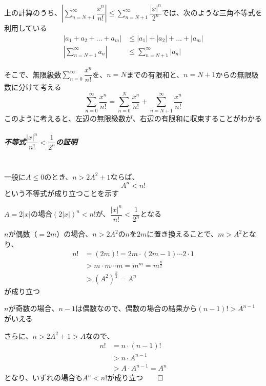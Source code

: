 \documentclass[../book_jiriki_calc]{subfiles}
\begin{document}
上の計算のうち、$\displaystyle\left| \sum_{n=N+1}^{\infty} \dfrac{x^n}{n!} \right| \leq \sum_{n=N+1}^{\infty} \dfrac{\left| x \right|^n}{2^n}$では、次のような三角不等式を利用している
\begin{align}
  \left| a_1 + a_2 + \dots + a_m \right|   & \leq |a_1| + |a_2| + \dots + |a_m| \\
  \left| \sum_{n=N+1}^{\infty} a_n \right| & \leq \sum_{n=N+1}^{\infty} |a_n|
\end{align}

\br

そこで、無限級数$\displaystyle\sum_{n=0}^{\infty} \dfrac{x^n}{n!}$を、$n=N$までの有限和と、$n=N+1$からの無限級数に分けて考える
\begin{equation}
  \sum_{n=0}^{\infty} \dfrac{x^n}{n!} = \sum_{n=0}^{N} \dfrac{x^n}{n!} + \sum_{n=N+1}^{\infty} \dfrac{x^n}{n!}
\end{equation}
このように考えると、左辺の無限級数が、右辺の有限和に収束することがわかる

\br

\subparagraph{不等式$\dfrac{\left|x\right|^n}{n!} < \dfrac{1}{2^n}$の証明}\quad\\

一般に$A \leq 0$のとき、$n > 2A^2 + 1$ならば、
\begin{equation}
  A^n < n!
\end{equation}
という不等式が成り立つことを示す

\br

$A=2|x|$の場合$\left( 2|x| \right)^n < n!$が、$\dfrac{\left|x\right|^n}{n!} < \dfrac{1}{2^n}$となる

\br

$n$が偶数（$=2m$）の場合、$n > 2A^2$の$n$を$2m$に置き換えることで、$m > A^2$となり、
\begin{align}
  n! & = (2m)! = 2m \cdot (2m-1) \cdots 2 \cdot 1   \\
     & > m \cdot m \cdots m = m^m = m^{\frac{n}{2}} \\
     & > \left( A^2 \right)^{\frac{n}{2}} = A^n
\end{align}
が成り立つ

\br

$n$が奇数の場合、$n-1$は偶数なので、偶数の場合の結果から$(n-1)! > A^{n-1}$がいえる

さらに、$n > 2A^2 + 1 > A$なので、
\begin{align}
  n! & = n \cdot (n-1)!        \\
     & > n \cdot A^{n-1}       \\
     & > A \cdot A^{n-1} = A^n
\end{align}
となり、いずれの場合も$A^n < n!$が成り立つ$\qed$
\end{document}
